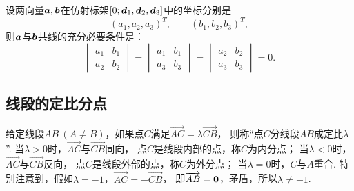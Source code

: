 \begin{theorem}\label{theorem:解析几何.两向量共线的充分必要条件2}
设两向量\(\boldsymbol{a},\boldsymbol{b}\)在仿射标架\([0;\boldsymbol{d}_1,\boldsymbol{d}_2,\boldsymbol{d}_3]\)中的坐标分别是\begin{equation*}
	(a_1,a_2,a_3)^T, \qquad
	(b_1,b_2,b_3)^T,
\end{equation*}
则\(\boldsymbol{a}\)与\(\boldsymbol{b}\)共线的充分必要条件是：\begin{equation*}
\begin{vmatrix}
	a_1 & b_1 \\
	a_2 & b_2
\end{vmatrix}
= \begin{vmatrix}
	a_1 & b_1 \\
	a_3 & b_3
\end{vmatrix}
= \begin{vmatrix}
	a_2 & b_2 \\
	a_3 & b_3
\end{vmatrix} = 0.
\end{equation*}
\end{theorem}

\subsection{线段的定比分点}
给定线段\(AB\ (A \neq B)\)，如果点\(C\)满足\(\vec{AC} = \lambda \vec{CB}\)，
则称“点\(C\)分线段\(AB\)成定比\(\lambda\)”.
当\(\lambda>0\)时，\(\vec{AC}\)与\(\vec{CB}\)同向，
点\(C\)是线段内部的点，称\(C\)为内分点；
当\(\lambda<0\)时，\(\vec{AC}\)与\(\vec{CB}\)反向，
点\(C\)是线段外部的点，称\(C\)为外分点；
当\(\lambda=0\)时，\(C\)与\(A\)重合.
特别注意到，假如\(\lambda=-1\)，\(\vec{AC}=-\vec{CB}\)，
即\(\overrightarrow{AB}=\boldsymbol{0}\)，矛盾，所以\(\lambda\neq-1\).

